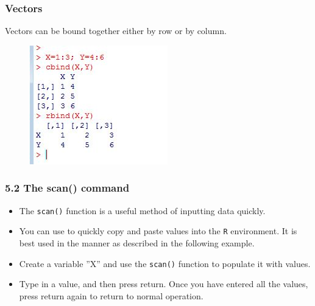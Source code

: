 \documentclass{beamer}
\begin{document}
 	\begin{frame}
 		\frametitle{Vectors} 
 		Vectors can be bound together either by row or by column.
 		\begin{figure}
 			\centering
 			\includegraphics[width=1.0\linewidth]{images/cbindrbind}
 		\end{figure}
 		
 	\end{frame}
 	\begin{frame}
 		\frametitle{5.2 The scan() command}
 		\begin{itemize}
 			\item The \texttt{scan()} function is a useful method of inputting data quickly. 
 			\item You can use to quickly copy
 			and paste values into the \texttt{R} environment. It is best used in the manner as described in the
 			following example. 
 			\item Create a variable ”X” and use the \texttt{scan()} function to populate it with
 			values. 
 			\item Type in a value, and then press return. Once you have entered all the values, press
 			return again to return to normal operation.
 		\end{itemize}
 	\end{frame}
\end{document}
